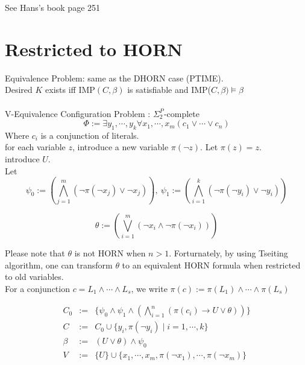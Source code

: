 \documentclass[12pt]{article}
\begin{document}
{See Hans's book page 251


\section{Restricted to HORN}


Equivalence Problem: same as the DHORN case (PTIME).\\

Desired $K$ exists iff IMP$(C,\beta)$ is satisfiable and IMP($C,\beta)\models \beta$\\ 

\ \\

V-Equivalence Configuration Problem :  $\Sigma_2^P$-complete\\ 


$$\Phi:=\exists y_1,\cdots, y_k \forall x_1,\cdots, x_m \left(c_1\vee\cdots\vee c_n \right)$$
%
Where $c_i$ is a conjunction of literals.\\

for each variable $z$, introduce a new variable $\pi(\neg z)$. Let $\pi(z)=z$.\\

introduce $U$.\\

Let $$\psi_0:=\left(\bigwedge_{j=1}^m (\neg \pi(\neg x_j)\vee \neg x_j)\right), \ \psi_1:= \left(\bigwedge_{i=1}^k(\neg \pi(\neg y_i)\vee \neg y_i)\right)$$

$$\theta:=\left(\bigvee_{i=1}^m (\neg x_i\wedge \neg\pi(\neg x_i))\right)$$


Please note that $\theta$ is not HORN  when $n>1$. Forturnately, by using Tseiting algorithm, one can transform  $\theta$ to an equivalent HORN formula when restricted to old variables. \\  



For a conjunction $c=L_1\wedge\cdots\wedge L_s$, we write 
$\pi(c):=\pi(L_1)\wedge\cdots\wedge \pi(L_s)$


$$\begin{array}{lcl}C_0&:=&\{\psi_0\wedge\psi_1 \wedge\left( \bigwedge_{i=1}^n(\pi(c_i)\rightarrow U\vee \theta)\right)\}\\ 

C&:=&C_0\cup \{y_i,\pi(\neg y_i)\mid i=1,\cdots,k\}\\
\beta&:= &(U\vee\theta)\wedge \psi_0 \\
V&:=&\{U\}\cup\{x_1,\cdots,x_m,\pi(\neg x_1),\cdots, \pi(\neg x_m)\}
\end{array}$$

}
\end{document}
